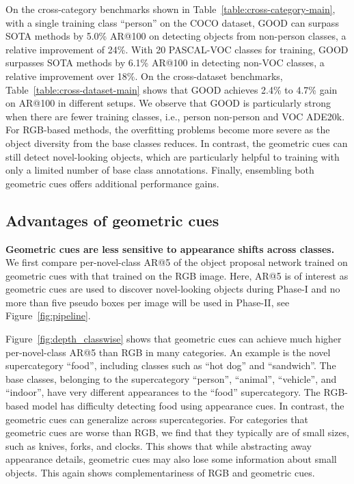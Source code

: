 \documentclass{article} \usepackage{iclr2023_conference,times}
\begin{document}
On the cross-category benchmarks shown in Table~\ref{table:cross-category-main}, with a single training class ``person'' on the COCO dataset, GOOD can surpass SOTA methods by 5.0\% AR@100 on detecting objects from non-person classes, a relative improvement of 24\%. With 20 PASCAL-VOC classes for training, GOOD surpasses SOTA methods by 6.1\% AR@100 in detecting non-VOC classes, a relative improvement over 18\%. On the cross-dataset benchmarks, Table~\ref{table:cross-dataset-main} shows that GOOD achieves 2.4\% to 4.7\% gain on AR@100 in different setups. We observe that GOOD is particularly strong when there are fewer training classes, i.e., person  non-person and VOC  ADE20k. For RGB-based methods, the overfitting problems become more severe as the object diversity from the base classes reduces. In contrast, the geometric cues can still detect novel-looking objects, which are particularly helpful to training with only a limited number of base class annotations. Finally, ensembling both geometric cues offers additional performance gains.



\subsection{Advantages of geometric cues}

\textbf{Geometric cues are less sensitive to appearance shifts across classes.}
We first compare per-novel-class AR@5 of the object proposal network trained on geometric cues with that trained on the RGB image. Here, AR@5 is of interest as geometric cues are used to discover novel-looking objects during Phase-I and no more than five pseudo boxes per image will be used in Phase-II, see Figure~\ref{fig:pipeline}.

Figure~\ref{fig:depth_classwise} shows that geometric cues can achieve much higher per-novel-class AR@5 than RGB in many categories. An example is the novel  supercategory ``food'', including classes such as ``hot dog'' and ``sandwich''. The base classes, belonging to the supercategory ``person'', ``animal'', ``vehicle'', and ``indoor'', have very different appearances to the ``food'' supercategory. The RGB-based model has difficulty detecting food using appearance cues.
In contrast, the  geometric cues can generalize across supercategories.
For categories that geometric cues are worse than RGB, we find that they typically are of small sizes, such as knives, forks, and clocks. This shows that while abstracting away appearance details, geometric cues may also lose some information about small objects. This again shows complementariness of RGB and geometric cues.
\end{document}
